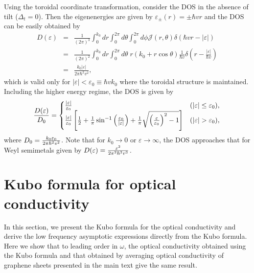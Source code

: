 \documentclass[aps,twocolumn,floatfix]{revtex4-1}
\begin{document}
Using the toroidal coordinate transformation, consider the DOS in the absence of tilt ($\Delta_{t}=0$). Then the eigenenergies are given by $\varepsilon_{\pm}(r)=\pm \hbar v r$ and
the DOS can be easily obtained by
\begin{eqnarray}
    D(\varepsilon)
    &=&
    \frac{1}{(2\pi)^3}
    \int_0^{k_0}
    dr
    \int_0^{2\pi}
    d\theta
    \int_0^{2\pi}
    d\phi
    \mathcal{J}(r,\theta) \delta\left(\hbar v r - |\varepsilon|\right)\\
    &=&
    \frac{1}{(2\pi)^2}
    \int_0^{k_0}
    dr
    \int_0^{2\pi}
    d\theta \;
    r(k_0+r\cos{\theta})
    \frac{1}{\hbar v}\delta\left(r - \frac{|\varepsilon|}{\hbar v}\right)\\
    &=&
    \frac{k_0 |\varepsilon| }{2 \pi \hbar^2 v^2 },
\end{eqnarray}
which is valid only for $|\varepsilon|<\varepsilon_0\equiv\hbar v k_0$ where the toroidal structure is maintained.
Including the higher energy regime, the DOS is given by
\begin{equation}\label{eq:residual_conductivity}
{D(\varepsilon)\over D_0} =
\begin{cases}
{|\varepsilon|\over \varepsilon_0} & (|\varepsilon|\le \varepsilon_0), \\
{|\varepsilon|\over \varepsilon_0}\left[{1\over 2}+{1\over \pi}\sin^{-1}\left({\varepsilon_0\over |\varepsilon|}\right)
+{1\over \pi}\sqrt{\left({\varepsilon\over\varepsilon_0}\right)^2-1}
\right] & (|\varepsilon|> \varepsilon_0),
\end{cases}
\end{equation}
where $D_0={k_0\varepsilon_0 \over 2\pi\hbar^2 v^2}$.
Note that for $k_0\rightarrow 0$ or $\varepsilon\rightarrow \infty$, the DOS approaches that for Weyl semimetals given by $D(\varepsilon)={\varepsilon^2\over 2\pi^2\hbar^3 v^3}$.


\section{Kubo formula for optical conductivity}
\label{sec:Kubo_formula}

In this section, we present the Kubo formula for the optical conductivity and derive the low frequency asymptotic expressions directly from the Kubo formula. Here we show that to leading order in $\omega$, the optical conductivity obtained using the Kubo formula and that obtained by averaging optical conductivity of graphene sheets presented in the main text give the same result.
\end{document}
